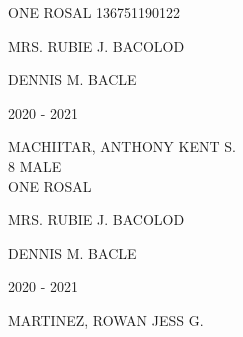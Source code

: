 \documentclass{article}
\begin{document}
{{\begin{multicols}{2}
\phantom{Grade} \hspace*{3em} ONE \phantom{Section} \hspace*{4em} ROSAL \phantom{LRN} \hspace*{4em} 136751190122 \\
\vspace*{25mm}
\begin{flushright}
MRS. RUBIE J. BACOLOD \hspace*{-1.5em}
\end{flushright}  
\vspace*{1.5mm}
\hspace*{3em} DENNIS M. BACLE
\end{multicols} 
\newpage
\begin{multicols}{2}
\phantom{u}
\columnbreak
\vspace*{-3mm}
\begin{center}
\phantom{school year:} \hspace*{6em} 2020 - 2021 
\end{center} 
\vspace{4mm} 
\phantom{Name:} \hspace*{5em} MACHIITAR, ANTHONY KENT S. \\[2.5mm] %
\phantom{Age} \hspace*{8em} 8  \phantom{Sex} \hspace*{12em} MALE \\[2.5mm] %
\phantom{Grade} \hspace*{3em} ONE \phantom{Section} \hspace*{4em} ROSAL \phantom{LRN} \hspace*{4em} \phantom{ } \\
\vspace*{25mm}
\begin{flushright}
MRS. RUBIE J. BACOLOD \hspace*{-1.5em}
\end{flushright}  
\vspace*{1.5mm}
\hspace*{3em} DENNIS M. BACLE
\end{multicols} 
\newpage
\begin{multicols}{2}
\phantom{u}
\columnbreak
\vspace*{-3mm}
\begin{center}
\phantom{school year:} \hspace*{6em} 2020 - 2021 
\end{center} 
\vspace{4mm} 
\phantom{Name:} \hspace*{5em} MARTINEZ, ROWAN JESS G. \\[2.5mm] %

\end{multicols}}}
\end{document}
